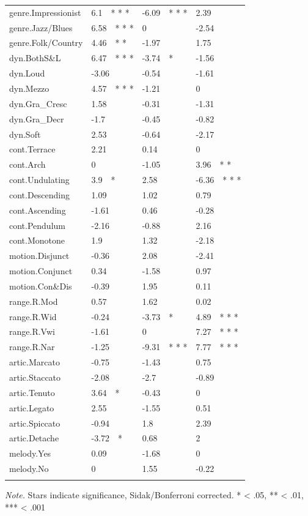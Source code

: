 \documentclass[
]{article}
\begin{document}
\begin{table}[tbp]
\begin{center}
\begin{threeparttable}
{\begin{tabular}{llll}
genre.Impressionist & 6.1\ \ * * * & -6.09\ \ * * * & 2.39\\
genre.Jazz/Blues & 6.58\ \ * * * & 0 & -2.54\\
genre.Folk/Country & 4.46\ \ * * & -1.97 & 1.75\\
dyn.BothS\&L & 6.47\ \ * * * & -3.74\ \ * & -1.56\\
dyn.Loud & -3.06 & -0.54 & -1.61\\
dyn.Mezzo & 4.57\ \ * * * & -1.21 & 0\\
dyn.Gra\_Cresc & 1.58 & -0.31 & -1.31\\
dyn.Gra\_Decr & -1.7 & -0.45 & -0.82\\
dyn.Soft & 2.53 & -0.64 & -2.17\\
cont.Terrace & 2.21 & 0.14 & 0\\
cont.Arch & 0 & -1.05 & 3.96\ \ * *\\
cont.Undulating & 3.9\ \ * & 2.58 & -6.36\ \ * * *\\
cont.Descending & 1.09 & 1.02 & 0.79\\
cont.Ascending & -1.61 & 0.46 & -0.28\\
cont.Pendulum & -2.16 & -0.88 & 2.16\\
cont.Monotone & 1.9 & 1.32 & -2.18\\
motion.Disjunct & -0.36 & 2.08 & -2.41\\
motion.Conjunct & 0.34 & -1.58 & 0.97\\
motion.Con\&Dis & -0.39 & 1.95 & 0.11\\
range.R.Mod & 0.57 & 1.62 & 0.02\\
range.R.Wid & -0.24 & -3.73\ \ * & 4.89\ \ * * *\\
range.R.Vwi & -1.61 & 0 & 7.27\ \ * * *\\
range.R.Nar & -1.25 & -9.31\ \ * * * & 7.77\ \ * * *\\
artic.Marcato & -0.75 & -1.43 & 0.75\\
artic.Staccato & -2.08 & -2.7 & -0.89\\
artic.Tenuto & 3.64\ \ * & -0.43 & 0\\
artic.Legato & 2.55 & -1.55 & 0.51\\
artic.Spiccato & -0.94 & 1.8 & 2.39\\
artic.Detache & -3.72\ \ * & 0.68 & 2\\
melody.Yes & 0.09 & -1.68 & 0\\
melody.No & 0 & 1.55 & -0.22\\
\bottomrule
\addlinespace
\end{tabular}

}

\begin{tablenotes}[para]
\normalsize{\textit{Note.} Stars indicate significance, Sidak/Bonferroni corrected. 
* < .05, ** < .01, *** < .001}
\end{tablenotes}

\end{threeparttable}
\end{center}

\end{table}
\end{document}
